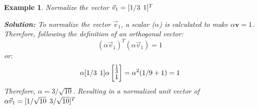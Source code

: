 \documentclass[12pt,letter]{article}
\newtheorem{ex}{Example}
\numberwithin{ex}{section} %
\newenvironment{example}{\begin{mdframed}[middlelinewidth=0.5mm]\begin{ex}\normalfont}{\end{ex}\end{mdframed}}
\numberwithin{re}{section} %
\begin{document}
\begin{example}
\label{ex:vector_normalizeation}
Normalize the vector $\vec{v}_1=[1/3 \hspace{1ex} 1]^T$

\textbf{Solution:} To normalize the vector $\vec{v}_1$, a scalar ($\alpha$) is calculated to make $\alpha\textbf{v}=1$.  Therefore, following the definition of an orthogonal vector:
\begin{equation}
(\alpha \vec{v}_1)^T(\alpha \vec{v}_1) = 1
\end{equation}
or:
\begin{equation}
\alpha [1/3 \hspace{1ex} 1]\alpha  \begin{bmatrix} \frac{1}{3}\\  1 \end{bmatrix}  = \alpha^2(1/9+1) = 1
\end{equation}
Therefore, $\alpha=3/\sqrt{10}$. Resulting in a normalized unit vector of $\alpha\vec{v}_1=[1/\sqrt{10} \hspace{1ex} 3/\sqrt{10}]^T$

\end{example}
\end{document}
